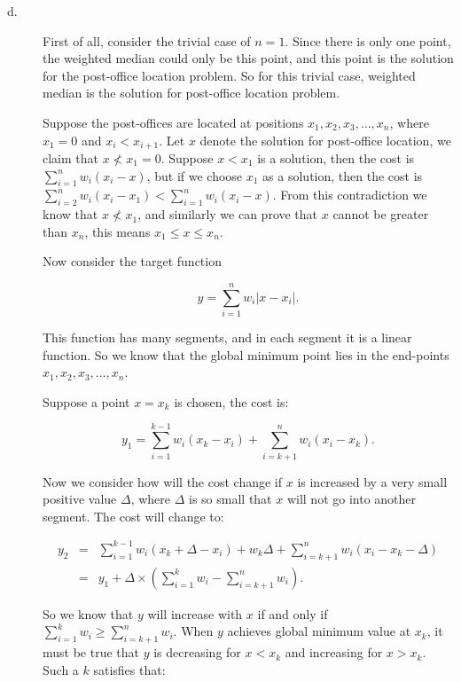 \begin{description}

\item[d. \hspace{9pt}] First of all, consider the trivial case of $n = 1$. Since there is only one point, the weighted median could only be this point, and this point
is the solution for the post-office location problem. So for this trivial case, weighted median is the solution for post-office location problem.

Suppose the post-offices are located at positions $x_1, x_2, x_3, \ldots, x_n$, where $x_1 = 0$ and $x_i < x_{i + 1}$. Let $x$ denote the solution for post-office location, we claim that
$x\nless x_1 = 0$. Suppose $x < x_1$ is a solution, then the cost is $\sum_{i = 1}^n{w_i(x_i - x)}$, but if we choose $x_1$ as a solution, then the cost is
$\sum_{i = 2}^n{w_i(x_i - x_1)} < \sum_{i = 1}^n{w_i(x_i - x)}$. From this contradiction we know that $x\nless x_1$, and similarly we can prove that $x$ cannot be greater than $x_n$,
this means $x_1 \leq x \leq x_n$.

Now consider the target function

$$y = \sum_{i = 1}^n{w_i|x - x_i|}.$$

This function has many segments, and in each segment it is a linear function. So we know that the global minimum point lies in the end-points $x_1, x_2, x_3, \ldots, x_n$.

Suppose a point $x = x_k$ is chosen, the cost is:

$$y_1 = \sum_{i = 1}^{k - 1}{w_i(x_k - x_i)} + \sum_{i = k + 1}^n{w_i(x_i - x_k)}.$$

Now we consider how will the cost change if $x$ is increased by a very small positive value $\Delta$, where $\Delta$ is so small that $x$ will not
go into another segment. The cost will change to:

\begin{eqnarray*}
y_2 &=& \sum_{i = 1}^{k - 1}w_i(x_k + \Delta - x_i) + w_k \Delta + \sum_{i = k+1}^{n}{w_i(x_i - x_k - \Delta)}\\
&=& y_1 + \Delta\times\left(\sum_{i = 1}^k w_i - \sum_{i = k+1}^n w_i \right).
\end{eqnarray*}

So we know that $y$ will increase with $x$  if and only if $\sum_{i = 1}^k w_i \geq \sum_{i = k+1}^n w_i$. When $y$ achieves global minimum value at $x_k$,
it must be true that $y$ is decreasing for $x< x_k$ and increasing for $x> x_k$. Such a $k$ satisfies that:


\end{description}
